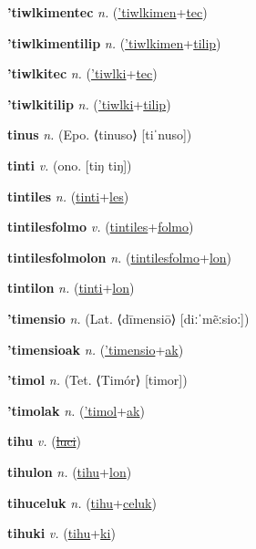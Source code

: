 \textbf{\hypertarget{'tiwlkimentec}{'tiwlkimentec}} \textit{n.} (\hyperlink{'tiwlkimen}{'tiwlkimen}+\allowbreak \hyperlink{tec}{tec})


\textbf{\hypertarget{'tiwlkimentilip}{'tiwlkimentilip}} \textit{n.} (\hyperlink{'tiwlkimen}{'tiwlkimen}+\allowbreak \hyperlink{tilip}{tilip})


\textbf{\hypertarget{'tiwlkitec}{'tiwlkitec}} \textit{n.} (\hyperlink{'tiwlki}{'tiwlki}+\allowbreak \hyperlink{tec}{tec})


\textbf{\hypertarget{'tiwlkitilip}{'tiwlkitilip}} \textit{n.} (\hyperlink{'tiwlki}{'tiwlki}+\allowbreak \hyperlink{tilip}{tilip})


\textbf{\hypertarget{tinus}{tinus}} \textit{n.} (Epo. ⟨tinuso⟩ [tiˈnuso])


\textbf{\hypertarget{tinti}{tinti}} \textit{v.} (ono. [tiŋ tiŋ])


\textbf{\hypertarget{tintiles}{tintiles}} \textit{n.} (\hyperlink{tinti}{tinti}+\allowbreak \hyperlink{les}{les})


\textbf{\hypertarget{tintilesfolmo}{tintilesfolmo}} \textit{v.} (\hyperlink{tintiles}{tintiles}+\allowbreak \hyperlink{folmo}{folmo})


\textbf{\hypertarget{tintilesfolmolon}{tintilesfolmolon}} \textit{n.} (\hyperlink{tintilesfolmo}{tintilesfolmo}+\allowbreak \hyperlink{lon}{lon})


\textbf{\hypertarget{tintilon}{tintilon}} \textit{n.} (\hyperlink{tinti}{tinti}+\allowbreak \hyperlink{lon}{lon})


\textbf{\hypertarget{'timensio}{'timensio}} \textit{n.} (Lat. ⟨dīmensiō⟩ [diːˈmẽːsioː])


\textbf{\hypertarget{'timensioak}{'timensioak}} \textit{n.} (\hyperlink{'timensio}{'timensio}+\allowbreak \hyperlink{ak}{ak})


\textbf{\hypertarget{'timol}{'timol}} \textit{n.} (Tet. ⟨Timór⟩ [timor])


\textbf{\hypertarget{'timolak}{'timolak}} \textit{n.} (\hyperlink{'timol}{'timol}+\allowbreak \hyperlink{ak}{ak})


\textbf{\hypertarget{tihu}{tihu}} \textit{v.} (\hyperlink{luci}{\sout{luci}})


\textbf{\hypertarget{tihulon}{tihulon}} \textit{n.} (\hyperlink{tihu}{tihu}+\allowbreak \hyperlink{lon}{lon})


\textbf{\hypertarget{tihuceluk}{tihuceluk}} \textit{n.} (\hyperlink{tihu}{tihu}+\allowbreak \hyperlink{celuk}{celuk})


\textbf{\hypertarget{tihuki}{tihuki}} \textit{v.} (\hyperlink{tihu}{tihu}+\allowbreak \hyperlink{ki}{ki})


